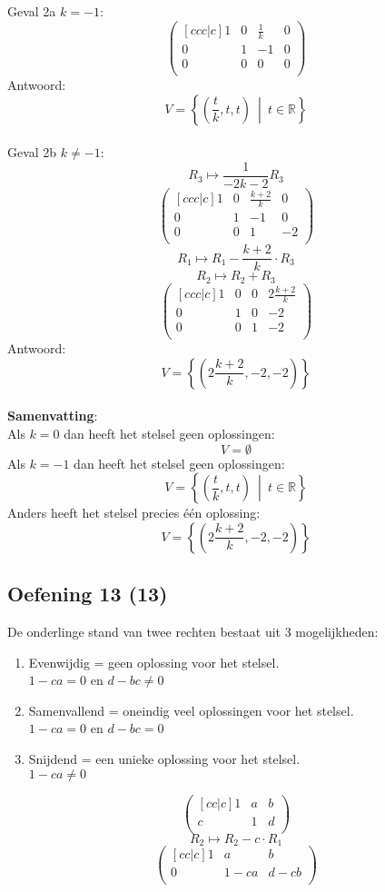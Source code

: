 \documentclass[lineaire_algebra_oplossingen.tex]{subfiles}
\begin{document}
Geval 2a $k=-1$:
\[
\begin{pmatrix}[ccc|c]
1 & 0 & \frac{1}{k} & 0\\
0 & 1 & -1 & 0\\
0 & 0 & 0 & 0\\
\end{pmatrix}
\]
Antwoord:
\[
V=\left\{\left(\frac{t}{k},t,t\right)\ \middle|\ t \in \mathbb{R}\right\}
\]\\
Geval 2b $k\neq-1$:
\[ R_3 \longmapsto \frac{1}{-2k-2}R_3\]
\[
\begin{pmatrix}[ccc|c]
1 & 0 & \frac{k+2}{k} & 0\\
0 & 1 & -1 & 0\\
0 & 0 & 1 & -2\\
\end{pmatrix}
\]
\[ R_1 \longmapsto R_1 - \frac{k+2}{k}\cdot R_3 \]
\[ R_2 \longmapsto R_2 + R_3 \]
\[
\begin{pmatrix}[ccc|c]
1 & 0 & 0 & 2\frac{k+2}{k}\\
0 & 1 & 0 & -2\\
0 & 0 & 1 & -2\\
\end{pmatrix}
\]
Antwoord:
\[
V=\left\lbrace\left(2\frac{k+2}{k},-2,-2\right)\right\rbrace
\]\\
\textbf{Samenvatting}:\\
Als $k=0$ dan heeft het stelsel geen oplossingen:
\[
V=\emptyset
\]
Als $k=-1$ dan heeft het stelsel geen oplossingen:
\[
V=\left\lbrace\left(\frac{t}{k},t,t\right)\ \middle|\ t \in \mathbb{R}\right\rbrace
\]
Anders heeft het stelsel precies \'e\'en oplossing:
\[
V=\left\lbrace\left(2\frac{k+2}{k},-2,-2\right)\right\rbrace
\]

\subsection{Oefening 13 (13)}
De onderlinge stand van twee rechten bestaat uit 3 mogelijkheden:
\begin{enumerate}
\item Evenwijdig = geen oplossing voor het stelsel.\\
$1-ca = 0$ en $ d -bc \neq 0$
\item Samenvallend = oneindig veel oplossingen voor het stelsel.\\
$1-ca = 0$ en $ d -bc = 0$
\item Snijdend = een unieke oplossing voor het stelsel.\\
$1-ca \neq 0$
\end{enumerate}
\[
\begin{pmatrix}[cc|c]
1 & a & b\\
c & 1 & d\\
\end{pmatrix}
\]
\[ R_2 \longmapsto R_2 - c \cdot R_1\]
\[
\begin{pmatrix}[cc|c]
1 & a & b\\
0 & 1-ca & d-cb\\
\end{pmatrix}
\]
\end{document}
